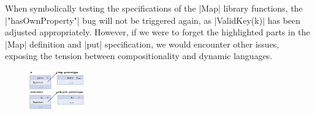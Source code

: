 

When symbolically testing the specifications of the \jsinline|Map| library functions, the \jsinline|"hasOwnProperty"| bug will not be triggered again, as \jsinline|ValidKey(k)| has been adjusted appropriately. However, if we were to forget the highlighted parts in the \jsinline|Map| definition and \jsinline|put| specification, we would encounter other issues, exposing the tension between compositionality and dynamic languages. 

\begin{figure}
\vspace*{-0.4cm}
\hspace*{-0.6cm}
\centering
\includegraphics[width=0.21\textwidth]{figures/compositional.png}
\vspace*{-0.58cm}
\caption*{\hspace*{-0.58cm}{\small Figure 2. Compositionality}}
\vspace*{-0.4cm}
\end{figure}

